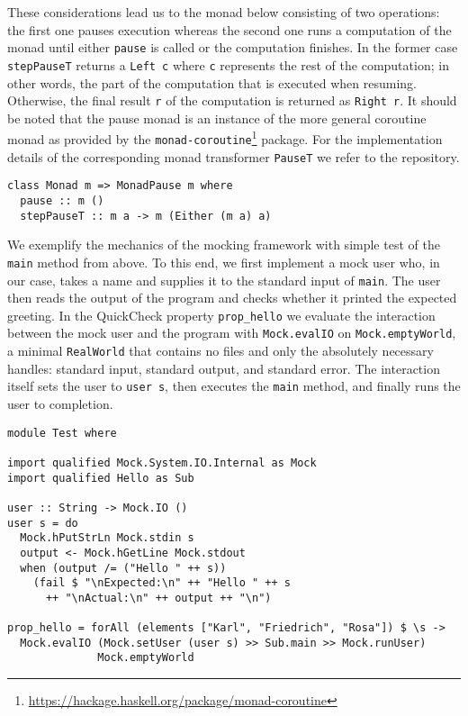 These considerations lead us to the monad below consisting of two operations: the first one pauses execution whereas the second one runs a computation of the monad until either \texttt{pause} is called or the computation finishes.
In the former case \texttt{stepPauseT} returns a \texttt{Left c} where \texttt{c} represents the rest of the computation; in other words, the part of the computation that is executed when resuming.
Otherwise, the final result \texttt{r} of the computation is returned as \texttt{Right r}.
It should be noted that the pause monad is an instance of the more general coroutine monad as provided by the \texttt{monad-coroutine}\footnote{\url{https://hackage.haskell.org/package/monad-coroutine}} package.
For the implementation details of the corresponding monad transformer \texttt{PauseT} we refer to the repository.
\begin{verbatim}
class Monad m => MonadPause m where
  pause :: m ()
  stepPauseT :: m a -> m (Either (m a) a)
\end{verbatim}
We exemplify the mechanics of the mocking framework with simple test of the \texttt{main} method from above.
To this end, we first implement a mock user who, in our case, takes a name and supplies it to the standard input of \texttt{main}.
The user then reads the output of the program and checks whether it printed the expected greeting.
In the QuickCheck property \texttt{prop_hello} we evaluate the interaction between the mock user and the program with \texttt{Mock.evalIO} on \texttt{Mock.emptyWorld}, a minimal \texttt{RealWorld} that contains no files and only the absolutely necessary handles: standard input, standard output, and standard error.
The interaction itself sets the user to \texttt{user s}, then executes the \texttt{main} method, and finally runs the user to completion.
\begin{verbatim}
module Test where

import qualified Mock.System.IO.Internal as Mock
import qualified Hello as Sub

user :: String -> Mock.IO ()
user s = do
  Mock.hPutStrLn Mock.stdin s
  output <- Mock.hGetLine Mock.stdout
  when (output /= ("Hello " ++ s))
    (fail $ "\nExpected:\n" ++ "Hello " ++ s
      ++ "\nActual:\n" ++ output ++ "\n")

prop_hello = forAll (elements ["Karl", "Friedrich", "Rosa"]) $ \s ->
  Mock.evalIO (Mock.setUser (user s) >> Sub.main >> Mock.runUser)
              Mock.emptyWorld
\end{verbatim}

